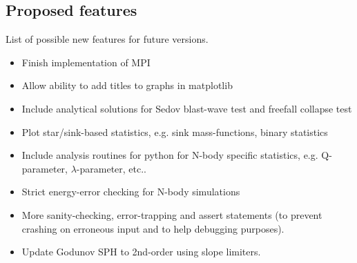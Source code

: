 \documentclass[a4paper]{article}
\begin{document}
\subsection{Proposed features}
List of possible new features for future versions.

\begin{itemize}
\item Finish implementation of MPI
\item Allow ability to add titles to graphs in matplotlib
\item Include analytical solutions for Sedov blast-wave test and freefall collapse test
\item Plot star/sink-based statistics, e.g. sink mass-functions, binary statistics
\item Include analysis routines for python for N-body specific statistics, e.g. Q-parameter, $\lambda$-parameter, etc..
\item Strict energy-error checking for N-body simulations
\item More sanity-checking, error-trapping and assert statements (to prevent crashing on erroneous input and to help debugging purposes).
\item Update Godunov SPH to 2nd-order using slope limiters.
\end{itemize}
\end{document}
